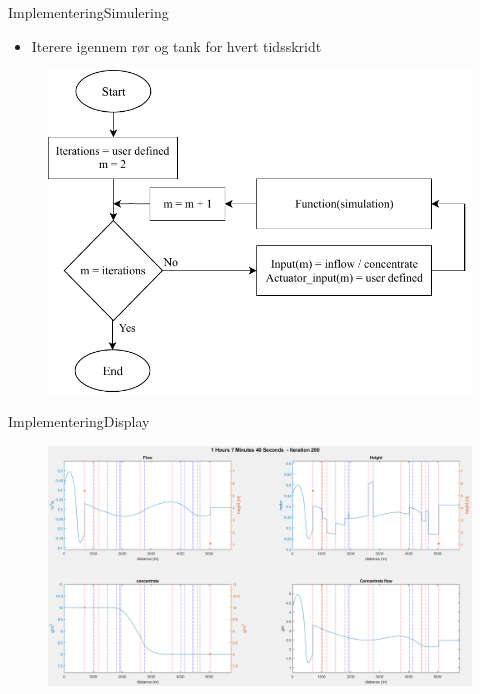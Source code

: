 \begin{frame}{Implementering}{Simulering}
\vfill \vfill \centering
    \begin{itemize}
    	\item Iterere igennem rør og tank for hvert tidsskridt 
    \end{itemize}

    \begin{figure}[H]
\centering
\includegraphics[width=0.5 \textwidth]{figures/simu_main_chart.pdf}
\label{fig:simu_main_chart}
\end{figure}

\vfill \vfill
\end{frame}

\begin{frame}{Implementering}{Display}
     \begin{figure}[h]
 \centering
 \includegraphics[width=1.0 \textwidth]{figures/display_result_matlab.png}
 \label{fig:display_result_matlab}
 \end{figure}
\end{frame}



